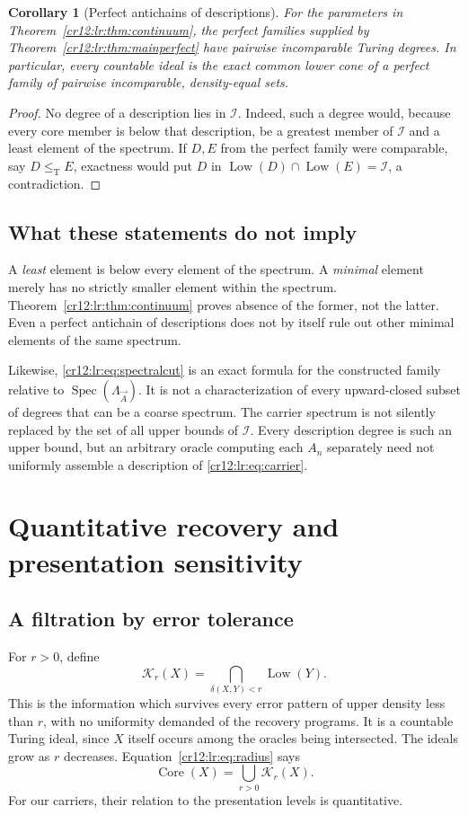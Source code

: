 \documentclass[11pt,letterpaper]{article}
\theoremstyle{plain}
\newtheorem{corollary}[theorem]{Corollary}
\theoremstyle{definition}
\theoremstyle{remark}
\numberwithin{equation}{section}
\newcommand{\leT}{\leq_{\mathrm T}}
\newcommand{\Core}{\operatorname{Core}}
\newcommand{\Low}{\operatorname{Low}}
\newcommand{\Spec}{\operatorname{Spec}}
\newcommand{\I}{\mathcal I}
\newcommand{\Lam}{\Lambda_{\vec A}}      %
\begin{document}
\begin{corollary}[Perfect antichains of descriptions]\label{cr12:lr:cor:antichain}
For the parameters in Theorem~\ref{cr12:lr:thm:continuum}, the perfect families
supplied by Theorem~\ref{cr12:lr:thm:mainperfect} have pairwise incomparable Turing
degrees. In particular, every countable ideal is the exact common lower cone of a
perfect family of pairwise incomparable, density-equal sets.
\end{corollary}
\begin{proof}
No degree of a description lies in $\I$. Indeed, such a degree would, because every
core member is below that description, be a greatest member of $\I$ and a least
element of the spectrum. If $D,E$ from the perfect family were comparable, say
$D\leT E$, exactness would put $D$ in $\Low(D)\cap\Low(E)=\I$, a contradiction.
\end{proof}

\subsection{What these statements do not imply}
A \emph{least} element is below every element of the spectrum. A \emph{minimal}
element merely has no strictly smaller element within the spectrum.
Theorem~\ref{cr12:lr:thm:continuum} proves absence of the former, not the latter. Even
a perfect antichain of descriptions does not by itself rule out other minimal elements
of the same spectrum.

Likewise, \eqref{cr12:lr:eq:spectralcut} is an exact formula for the constructed
family relative to $\Spec(\Lam)$. It is not a characterization of every upward-closed
subset of degrees that can be a coarse spectrum. The carrier spectrum is not silently
replaced by the set of all upper bounds of $\I$. Every description degree is such an
upper bound, but an arbitrary oracle computing each $A_n$ separately need not
uniformly assemble a description of \eqref{cr12:lr:eq:carrier}.

\section{Quantitative recovery and presentation sensitivity}\label{cr12:lr:sec:radii}
\subsection{A filtration by error tolerance}
For $r>0$, define
\begin{equation}\label{cr12:lr:eq:Ir}
 \mathcal K_r(X)=\bigcap_{\delta(X,Y)<r}\Low(Y).
\end{equation}
This is the information which survives every error pattern of upper density less than
$r$, with no uniformity demanded of the recovery programs. It is a countable Turing
ideal, since $X$ itself occurs among the oracles being intersected. The ideals grow as
$r$ decreases. Equation~\eqref{cr12:lr:eq:radius} says
\[
 \Core(X)=\bigcup_{r>0}\mathcal K_r(X).
\]
For our carriers, their relation to the presentation levels is quantitative.
\end{document}
